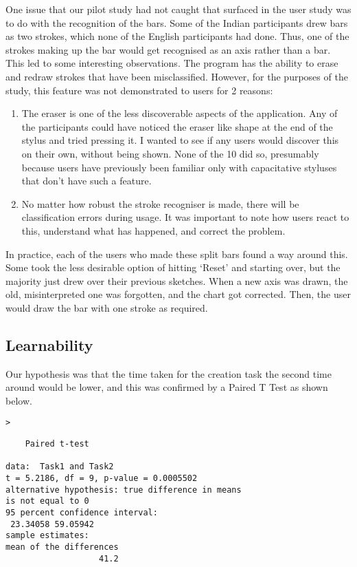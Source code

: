 One issue that our pilot study had not caught that surfaced in the user study was to do with the recognition of the bars. Some of the Indian participants drew bars as two strokes, which none of the English participants had done. Thus, one of the strokes making up the bar would get recognised as an axis rather than a bar. This led to some interesting observations. The program has the ability to erase and redraw strokes that have been misclassified. However, for the purposes of the study, this feature was not demonstrated to users for 2 reasons:
\begin{enumerate}
\item The eraser is one of the less discoverable aspects of the application. Any of the participants could have noticed the eraser like shape at the end of the stylus and tried pressing it. I wanted to see if any users would discover this on their own, without being shown. None of the 10 did so, presumably because users have previously been familiar only with capacitative styluses that don't have such a feature. 
\item No matter how robust the stroke recogniser is made, there will be classification errors during usage. It was important to note how users react to this, understand what has happened, and correct the problem.
\end{enumerate} 

In practice, each of the users who made these split bars found a way around this. Some took the less desirable option of hitting `Reset' and starting over, but the majority just drew over their previous sketches. When a new axis was drawn, the old, misinterpreted one was forgotten, and the chart got corrected. Then, the user would draw the bar with one stroke as required.

\subsection{Learnability}
Our hypothesis was that the time taken for the creation task the second time around would be lower, and this was confirmed by a Paired T Test as shown below.

\begin{alltt}
>   \hlstd{=} \hlstd{)}
\end{alltt}
\begin{verbatim} 
	Paired t-test

data:  Task1 and Task2
t = 5.2186, df = 9, p-value = 0.0005502
alternative hypothesis: true difference in means 
is not equal to 0
95 percent confidence interval:
 23.34058 59.05942
sample estimates:
mean of the differences 
                   41.2 
\end{verbatim}

